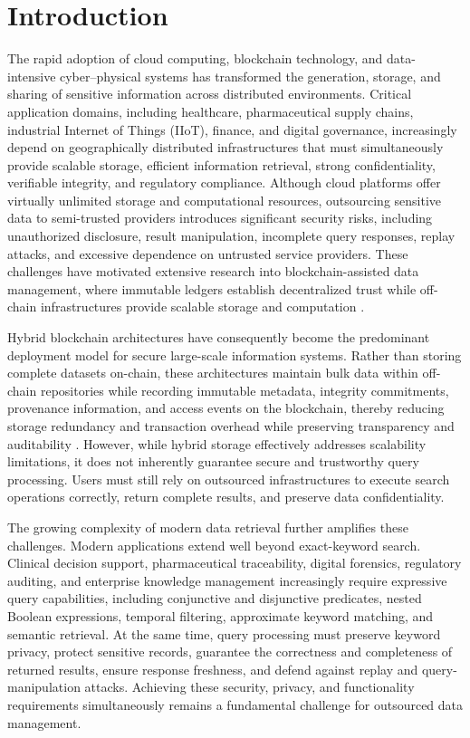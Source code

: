 \section{Introduction}
\label{sec:intro}

The rapid adoption of cloud computing, blockchain technology, and data-intensive cyber--physical systems has transformed the generation, storage, and sharing of sensitive information across distributed environments. Critical application domains, including healthcare, pharmaceutical supply chains, industrial Internet of Things (IIoT), finance, and digital governance, increasingly depend on geographically distributed infrastructures that must simultaneously provide scalable storage, efficient information retrieval, strong confidentiality, verifiable integrity, and regulatory compliance. Although cloud platforms offer virtually unlimited storage and computational resources, outsourcing sensitive data to semi-trusted providers introduces significant security risks, including unauthorized disclosure, result manipulation, incomplete query responses, replay attacks, and excessive dependence on untrusted service providers. These challenges have motivated extensive research into blockchain-assisted data management, where immutable ledgers establish decentralized trust while off-chain infrastructures provide scalable storage and computation \cite{Asiamah,Lai,Li}.

Hybrid blockchain architectures have consequently become the predominant deployment model for secure large-scale information systems. Rather than storing complete datasets on-chain, these architectures maintain bulk data within off-chain repositories while recording immutable metadata, integrity commitments, provenance information, and access events on the blockchain, thereby reducing storage redundancy and transaction overhead while preserving transparency and auditability \cite{Li,Zhou,Yang}. However, while hybrid storage effectively addresses scalability limitations, it does not inherently guarantee secure and trustworthy query processing. Users must still rely on outsourced infrastructures to execute search operations correctly, return complete results, and preserve data confidentiality.

The growing complexity of modern data retrieval further amplifies these challenges. Modern applications extend well beyond exact-keyword search. Clinical decision support, pharmaceutical traceability, digital forensics, regulatory auditing, and enterprise knowledge management increasingly require expressive query capabilities, including conjunctive and disjunctive predicates, nested Boolean expressions, temporal filtering, approximate keyword matching, and semantic retrieval. At the same time, query processing must preserve keyword privacy, protect sensitive records, guarantee the correctness and completeness of returned results, ensure response freshness, and defend against replay and query-manipulation attacks. Achieving these security, privacy, and functionality requirements simultaneously remains a fundamental challenge for outsourced data management.

